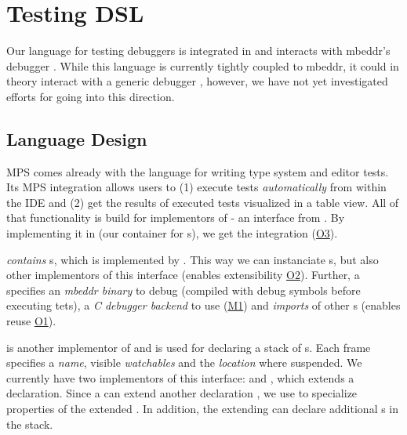 \section{Testing DSL}

Our language for testing debuggers is integrated in  and interacts
with mbeddr's debugger . While this language is currently tightly
coupled to mbeddr, it could in theory interact with a generic debugger ,
however, we have not yet investigated efforts for going into this direction.

\subsection{Language Design}

\ac{MPS} comes already with the language  for writing type
system and editor tests.
Its \ac{MPS} integration allows users to (1) execute tests \emph{automatically}
from within the \ac{IDE} and (2) get the results of executed tests visualized in a
table view. All of that functionality is build for implementors
of  - an interface from . By implementing it
in  (our container for
s), we get the  integration 
(\hyperref[O3]{O3}).

 \emph{contains} s, which is
implemented by . This way we can instanciate
s, but also other implementors of this interface
(enables extensibility \hyperref[O2]{O2}). Further, a 
specifies an \emph{mbeddr binary} to debug (compiled with debug symbols before
executing tets), a \emph{C debugger backend} to use (\hyperref[M1]{M1}) and
\emph{imports} of other s (enables reuse \hyperref[O1]{O1}).

 is another implementor of 
and is used for declaring a stack of s. Each frame specifies a
\emph{name}, visible \emph{watchables} and the \emph{location} where suspended.
We currently have two implementors of this interface: 
and , which extends a declaration. 
Since a  can extend another declaration
, we use  to specialize properties of
the extended . In addition, the extending
 can declare additional s in
the stack. 

